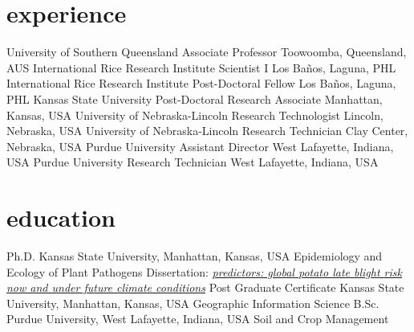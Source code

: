 \section*{experience}
\begin{entrylist}
    {University of Southern Queensland}
    {Associate Professor}
    {Toowoomba, Queensland, AUS}
    {International Rice Research Institute}
    {Scientist I}
    {Los Ba\~nos, Laguna, PHL}
    {International Rice Research Institute}
    {Post-Doctoral Fellow}
    {Los Ba\~nos, Laguna, PHL}
    {Kansas State University}
    {Post-Doctoral Research Associate}
    {Manhattan, Kansas, USA}
   {University of Nebraska-Lincoln}
   {Research Technologist}
   {Lincoln, Nebraska, USA}
   {University of Nebraska-Lincoln}
   {Research Technician}
   {Clay Center, Nebraska, USA}
   {Purdue University}
   {Assistant Director}
   {West Lafayette, Indiana, USA}
   {Purdue University}
   {Research Technician}
   {West Lafayette, Indiana, USA}
\end{entrylist}

\section*{education}\begin{entrylist}
    {Ph.D. {}}
    {Kansas State University, Manhattan, Kansas, USA}
    {Epidemiology and Ecology of Plant Pathogens}
  \entry{}
  {Dissertation: }
  {}
    {\emph{\href{https://krex.k-state.edu/dspace/handle/2097/2341?show=full}{predictors: global potato late blight risk now and under future climate conditions}}}
    {Post Graduate Certificate {}}
    {Kansas State University, Manhattan, Kansas, USA}
    {Geographic Information Science}
    {B.Sc. {}}
    {Purdue University, West Lafayette, Indiana, USA}
    {Soil and Crop Management}
\end{entrylist}
